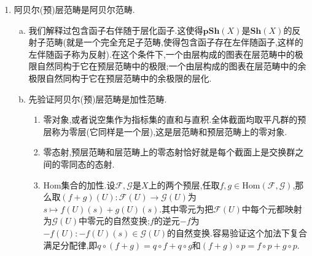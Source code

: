 \begin{enumerate}
\begin{enumerate}
\begin{proof}
			\qquad
			
			最后验证泛性质.任取$X$上的层$\mathscr{G}$和预层态射$\varphi:\mathscr{F}\to\mathscr{G}$,那么$\widetilde{\varphi}$如果取为把$(s_x)_{x\in U}\in\widetilde{\mathscr{F}}(U)$映射为$\varphi_x(s_x)$所对应的(粘合得到的)$\mathscr{G}(U)$中的元可以保证图表交换.它的唯一性是因为满足这个等式的$\widetilde{\varphi}$必须满足$\widetilde{\varphi}_x=\varphi_x$,而阿贝尔层之间的态射被茎同态唯一决定.
		\end{proof}
		\item 按照上述证明,层化态射$i_{\mathscr{F}}$的茎同态都是同构.特别的如果$\mathscr{F}$本身已经是层,那么层化态射$i_{\mathscr{F}}$是同构.
		\item 层化的泛性质等价于讲包含函子$j:\textbf{Sh}(X)\to\textbf{pSh}(X)$右伴随于层化函子,更具体地讲,任取$X$上的预层$\mathscr{F}$和层$\mathscr{G}$总有如下典范同构.特别的,这说明$\textbf{Sh}(X)$是$\textbf{pSh}(X)$的反射子范畴.
		$$\mathrm{Hom}_{\textbf{Sh}(X)}(\Gamma\Phi(\mathscr{F}),\mathscr{G})\cong\mathrm{Hom}_{\textbf{pSh}(X)}(\mathscr{F},i(\mathscr{G}))$$
	\end{enumerate}
	\item 阿贝尔(预)层范畴是阿贝尔范畴.
	\begin{enumerate}[(a)]
		\item 我们解释过包含函子右伴随于层化函子.这使得$\textbf{pSh}(X)$是$\textbf{Sh}(X)$的反射子范畴(就是一个完全充足子范畴,使得包含函子存在左伴随函子,这样的左伴随函子称为反射).在这个条件下,一个由层构成的图表在层范畴中的极限自然同构于它在预层范畴中的极限;一个由层构成的图表在层范畴中的余极限自然同构于它在预层范畴中的余极限的层化.
		\item 先验证阿贝尔(预)层范畴是加性范畴.
		\begin{enumerate}[(1)]
			\item 零对象,或者说空集作为指标集的直和与直积.全体截面均取平凡群的预层称为零层(它同样是一个层),这是层范畴和预层范畴上的零对象.
			\item 零态射,预层范畴和层范畴上的零态射恰好就是每个截面上是交换群之间的零同态的态射.
			\item Hom集合的加性.设$\mathscr{F},\mathscr{G}$是$X$上的两个预层,任取$f,g\in\mathrm{Hom}(\mathscr{F},\mathscr{G})$,那么取$(f+g)(U):\mathscr{F}(U)\to\mathscr{G}(U)$为$s\mapsto f(U)(s)+g(U)(s)$.其中零元为把$\mathscr{F}(U)$中每个元都映射为$\mathscr{G}(U)$中零元的自然变换;$f$的逆元$-f$为$-f(U):-f(U)(s)\in\mathscr{G}(U)$的自然变换.容易验证这个加法下复合满足分配律,即$q\circ(f+g)=q\circ f+q\circ g$和$(f+g)\circ p=f\circ p+g\circ p$.

\end{enumerate}
\end{enumerate}
\end{enumerate}

